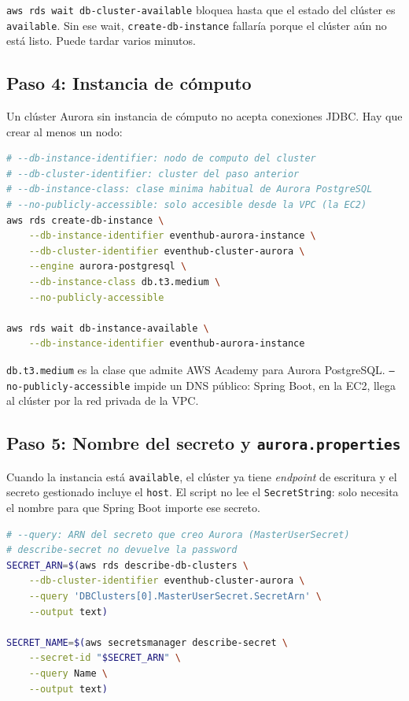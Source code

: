 \documentclass[12pt,a4paper]{article}
\begin{document}
\texttt{aws rds wait db-cluster-available} bloquea hasta que el estado del clúster es \texttt{available}. Sin ese wait, \texttt{create-db-instance} fallaría porque el clúster aún no está listo. Puede tardar varios minutos.

\subsection{Paso 4: Instancia de cómputo}

Un clúster Aurora sin instancia de cómputo no acepta conexiones JDBC. Hay que crear al menos un nodo:

\begin{lstlisting}[language=bash,basicstyle=\ttfamily\footnotesize]
# --db-instance-identifier: nodo de computo del cluster
# --db-cluster-identifier: cluster del paso anterior
# --db-instance-class: clase minima habitual de Aurora PostgreSQL
# --no-publicly-accessible: solo accesible desde la VPC (la EC2)
aws rds create-db-instance \
    --db-instance-identifier eventhub-aurora-instance \
    --db-cluster-identifier eventhub-cluster-aurora \
    --engine aurora-postgresql \
    --db-instance-class db.t3.medium \
    --no-publicly-accessible

aws rds wait db-instance-available \
    --db-instance-identifier eventhub-aurora-instance
\end{lstlisting}

\vspace{1em}

\texttt{db.t3.medium} es la clase que admite AWS Academy para Aurora PostgreSQL. \texttt{--no-publicly-accessible} impide un DNS público: Spring Boot, en la EC2, llega al clúster por la red privada de la VPC.

\subsection{Paso 5: Nombre del secreto y \texttt{aurora.properties}}

Cuando la instancia está \texttt{available}, el clúster ya tiene \textit{endpoint} de escritura y el secreto gestionado incluye el \texttt{host}. El script no lee el \texttt{SecretString}: solo necesita el nombre para que Spring Boot importe ese secreto.

\begin{lstlisting}[language=bash,basicstyle=\ttfamily\footnotesize]
# --query: ARN del secreto que creo Aurora (MasterUserSecret)
# describe-secret no devuelve la password
SECRET_ARN=$(aws rds describe-db-clusters \
    --db-cluster-identifier eventhub-cluster-aurora \
    --query 'DBClusters[0].MasterUserSecret.SecretArn' \
    --output text)

SECRET_NAME=$(aws secretsmanager describe-secret \
    --secret-id "$SECRET_ARN" \
    --query Name \
    --output text)
\end{lstlisting}
\end{document}
